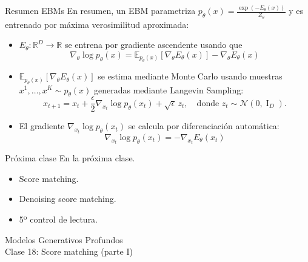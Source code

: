 \documentclass{beamer}
\newcommand{\R}{\mathbb{R}}
\begin{document}
\begin{frame}{Resumen EBMs}
    En resumen, un EBM parametriza $p_\theta(x)=\frac{\exp\left(-E_\theta(x)\right)}{Z_\theta}$ y es entrenado por máxima verosimilitud aproximada:
    \begin{itemize}
        \item $E_\theta:\R^D\to\R$ se entrena por gradiente ascendente usando que
              \begin{equation*}
                  \nabla_\theta\log p_\theta(x)=\mathbb{E}_{p_\theta(x)}\left[\nabla_\theta E_\theta(x)\right]-\nabla_\theta E_\theta(x)
              \end{equation*}
        \item $\mathbb{E}_{p_\theta(x)}\left[\nabla_\theta E_\theta(x)\right]$ se estima mediante Monte Carlo usando muestras $x^1,\ldots,x^K\sim p_\theta(x)$ generadas mediante Langevin Sampling:
              \begin{equation*}
                  x_{t+1} = x_t+\frac{\epsilon}{2} \nabla_{x_t} \log p_\theta(x_t)+\sqrt{\epsilon}\, z_t,
                  \quad\text{donde }
                  z_t\sim\mathcal{N}(0,\operatorname{I}_D).
              \end{equation*}
        \item El gradiente $\nabla_{x_t} \log p_\theta(x_t)$ se calcula por diferenciación automática:
              \begin{equation*}
                  \nabla_{x_t}\log p_\theta(x_t) =-\nabla_{x_t}E_\theta(x_t)
              \end{equation*}
    \end{itemize}
\end{frame}

\begin{frame}{Próxima clase}
    En la próxima clase.
    \begin{itemize}
        \item Score matching.
        \item Denoising score matching.
        \item 5º control de lectura.
    \end{itemize}
\end{frame}

\begin{frame}
    \centering
    \Large{Modelos Generativos Profundos}\\
    \large{Clase 18: Score matching (parte I)}
\end{frame}
\end{document}
